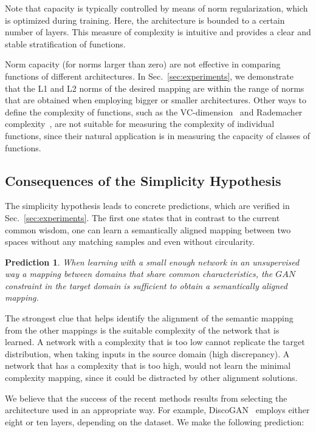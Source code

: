 \documentclass{article} %
\newtheorem{pred}{Prediction}
\begin{document}
Note that capacity is typically controlled by means of norm regularization, which is optimized during training. Here, the architecture is bounded to a certain number of layers. This measure of complexity is intuitive and provides a clear and stable stratification of functions. 
 
Norm capacity (for norms larger than zero) are not effective in comparing functions of different architectures. In Sec.~\ref{sec:experiments}, we demonstrate that the L1 and L2 norms of the desired mapping are within the range of norms that are obtained when employing bigger or smaller architectures. Other ways to define the complexity of functions, such as the VC-dimension~\citep{vapnik:264} and Rademacher complexity~\citep{Bartlett:2003:RGC:944919.944944}, are not suitable for measuring the complexity of individual functions, since their natural application is in measuring the capacity of classes of functions. 

\subsection{Consequences of the Simplicity Hypothesis}

The simplicity hypothesis leads to concrete predictions, which are verified in Sec.~\ref{sec:experiments}. The first one states that in contrast to the current common wisdom, one can learn a semantically aligned mapping between two spaces without any matching samples and even without circularity. 

\begin{pred}\label{pred1}
When learning with a small enough network in an unsupervised way a mapping between domains that share common characteristics, the $GAN$ constraint in the target domain is sufficient to obtain a semantically aligned mapping.
\end{pred}

The strongest clue that helps identify the alignment of the semantic mapping from the other mappings is the suitable complexity of the network that is learned. A network with a complexity that is too low cannot replicate the target distribution, when taking inputs in the source domain (high discrepancy). A network that has a complexity that is too high, would not learn the minimal complexity mapping, since it could be distracted by other alignment solutions.

We believe that the success of the recent methods results from selecting the architecture used in an appropriate way. For example, DiscoGAN~\citep{discogan} employs either eight or ten layers, depending on the dataset. We make the following prediction:
\end{document}
